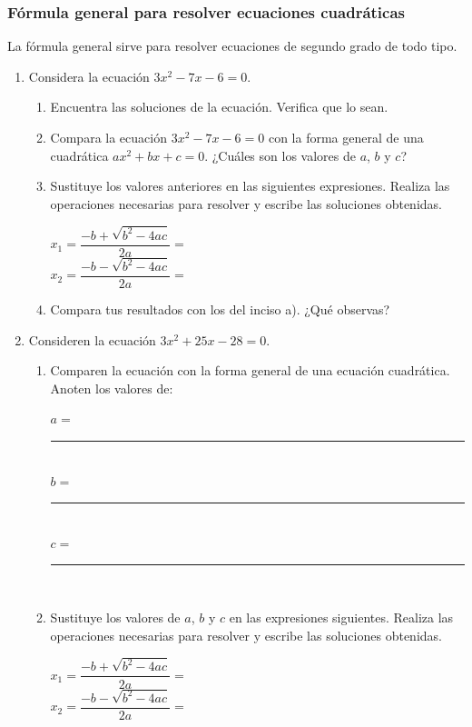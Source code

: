 \documentclass[11pt]{book}
\begin{document}
\subsubsection{Fórmula general para resolver ecuaciones cuadráticas}
La fórmula general sirve para resolver ecuaciones de segundo grado de todo tipo.

\begin{enumerate}
    \item Considera la ecuación $3x^2 - 7x - 6 = 0$.
          \begin{enumerate}
              \item Encuentra las soluciones de la ecuación. Verifica que lo sean.
              \item Compara la ecuación $3x^2 - 7x - 6 = 0$ con la forma general de una cuadrática $ax ^2 + bx + c = 0$. ¿Cuáles son los valores de $a$, $b$ y $c$?
              \item Sustituye los valores anteriores en las siguientes expresiones. Realiza las operaciones necesarias para resolver y escribe las soluciones obtenidas.

                    $ x_1= \dfrac{-b+\sqrt{b^2-4ac}}{2a} = $ \\[3ex]
                    $ x_2= \dfrac{-b-\sqrt{b^2-4ac}}{2a} = $
              \item Compara tus resultados con los del inciso a). ¿Qué observas?
          \end{enumerate}

    \item Consideren la ecuación $3x^2 + 25x - 28 = 0$.
          \begin{enumerate}
              \item Comparen la ecuación con la forma general de una ecuación cuadrática. Anoten
                    los valores de:

                    $a =$ \rule{15mm}{0.2mm}\\
                    $b =$ \rule{15mm}{0.2mm}\\
                    $c =$ \rule{15mm}{0.2mm}\\

              \item Sustituye los valores de $a$, $b$ y $c$ en las expresiones siguientes. Realiza las operaciones necesarias para resolver y escribe las soluciones obtenidas.

                    $ x_1= \dfrac{-b+\sqrt{b^2-4ac}}{2a} = $ \\[3ex]
                    $ x_2= \dfrac{-b-\sqrt{b^2-4ac}}{2a} = $


\end{enumerate}
\end{enumerate}
\end{document}
